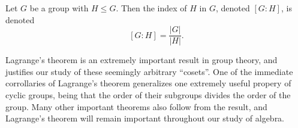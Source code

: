 \begin{definition}[Index]\label{dfn:aksj}
	Let $G$ be a group with $H\leq G$. Then the index of $H$ in $G$, denoted $[G:H]$, is denoted
	\[
		[G:H]=\frac{\left| G \right| }{\left| H \right| }
	.\]
\end{definition}

Lagrange's theorem is an extremely important result in group theory, and justifies our study of these seemingly arbitrary ``cosets''. One of the immediate corrollaries of Lagrange's theorem generalizes one extremely useful propery of cyclic groups, being that the order of their subgroups divides the order of the group. Many other important theorems also follow from the result, and Lagrange's theorem will remain important throughout our study of algebra.

